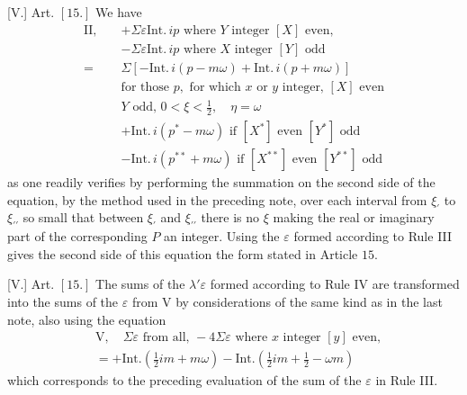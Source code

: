 [V.] Art. $[15.]$ We have
\[
\begin{aligned}
\mathrm{II},\quad&+\Sigma\varepsilon\mathrm{Int.}\,ip\text{ where }Y\text{ integer }[X]\text{ even},\\
&-\Sigma\varepsilon\mathrm{Int.}\,ip\text{ where }X\text{ integer }[Y]\text{ odd}\\
={}&\Sigma[-\mathrm{Int.}\,i(p-m\omega)+\mathrm{Int.}\,i(p+m\omega)]\\
&\text{for those }p,\text{ for which }x\text{ or }y\text{ integer, }[X]\text{ even}\\
&Y\text{ odd, }0<\xi<\tfrac12,\quad\eta=\omega\\
&+\mathrm{Int.}\,i(p^{*}-m\omega)\text{ if }[X^{*}]\text{ even }[Y^{*}]\text{ odd}\\
&-\mathrm{Int.}\,i(p^{**}+m\omega)\text{ if }[X^{**}]\text{ even }[Y^{**}]\text{ odd}
\end{aligned}
\]
as one readily verifies by performing the summation on the second side of the equation, by the method used in the preceding note, over each interval from $\xi_{\prime}$ to $\xi_{\prime\prime}$ so small that between $\xi_{\prime}$ and $\xi_{\prime\prime}$ there is no $\xi$ making the real or imaginary part of the corresponding $P$ an integer. Using the $\varepsilon$ formed according to Rule III gives the second side of this equation the form stated in Article $15$.

[V.] Art. $[15.]$ The sums of the $\lambda'\varepsilon$ formed according to Rule IV are transformed into the sums of the $\varepsilon$ from V by considerations of the same kind as in the last note, also using the equation
\[
\begin{aligned}
&\mathrm V,\quad\Sigma\varepsilon\text{ from all, }-4\Sigma\varepsilon\text{ where }x\text{ integer }[y]\text{ even},\\
&=+\mathrm{Int.}(\tfrac12im+m\omega)-\mathrm{Int.}(\tfrac12im+\tfrac12-\omega m)
\end{aligned}
\]
which corresponds to the preceding evaluation of the sum of the $\varepsilon$ in Rule III.

